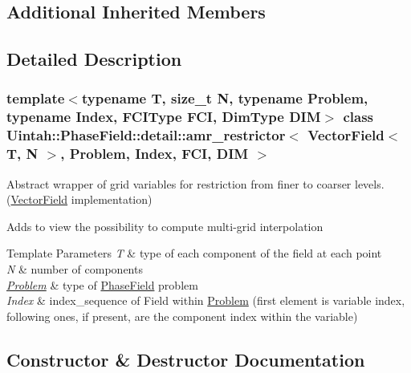 \subsection*{Additional Inherited Members}


\subsection{Detailed Description}
\subsubsection*{template$<$typename T, size\+\_\+t N, typename Problem, typename Index, F\+C\+I\+Type F\+CI, Dim\+Type D\+IM$>$\newline
class Uintah\+::\+Phase\+Field\+::detail\+::amr\+\_\+restrictor$<$ Vector\+Field$<$ T, N $>$, Problem, Index, F\+C\+I, D\+I\+M $>$}

Abstract wrapper of grid variables for restriction from finer to coarser levels. (\hyperlink{structUintah_1_1PhaseField_1_1VectorField}{Vector\+Field} implementation) 

Adds to view the possibility to compute multi-\/grid interpolation


\begin{DoxyTemplParams}{Template Parameters}
{\em T} & type of each component of the field at each point \\
\hline
{\em N} & number of components \\
\hline
{\em \hyperlink{classUintah_1_1PhaseField_1_1Problem}{Problem}} & type of \hyperlink{namespaceUintah_1_1PhaseField}{Phase\+Field} problem \\
\hline
{\em Index} & index\+\_\+sequence of Field within \hyperlink{classUintah_1_1PhaseField_1_1Problem}{Problem} (first element is variable index, following ones, if present, are the component index within the variable) \\
\hline
\end{DoxyTemplParams}


\subsection{Constructor \& Destructor Documentation}
\mbox{\label{classUintah_1_1PhaseField_1_1detail_1_1amr__restrictor_3_01VectorField_3_01T_00_01N_01_4_00_01Pre7f2e99a4fbf25ff00717d25c8580b1a_abdd0eb090306c15eaeeee55105877b1f}} 
